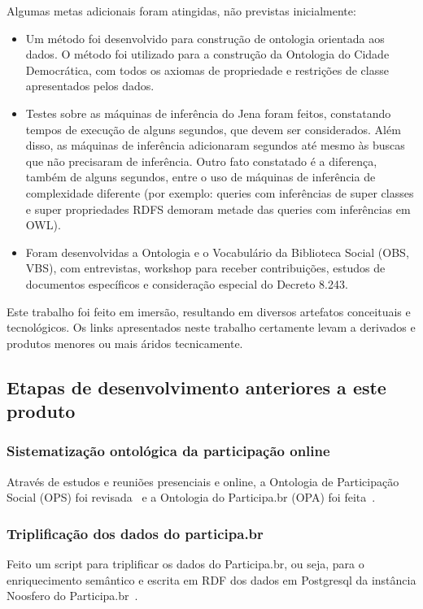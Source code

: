 \documentclass[12pt]{article}
\begin{document}
Algumas metas adicionais foram atingidas, não previstas inicialmente:
\begin{itemize}
    \item Um método foi desenvolvido para construção de ontologia orientada aos dados. O método foi utilizado para a construção da Ontologia do Cidade Democrática, com todos os axiomas de propriedade e restrições de classe apresentados pelos dados.
    \item Testes sobre as máquinas de inferência do Jena foram feitos, constatando tempos de execução de alguns segundos, que devem ser considerados. Além disso, as máquinas de inferência adicionaram segundos até mesmo às buscas que não precisaram de inferência. Outro fato constatado é a diferença, também de alguns segundos, entre o uso de máquinas de inferência de complexidade diferente (por exemplo: queries com inferências de super classes e super propriedades RDFS demoram metade das queries com inferências em OWL).
    \item Foram desenvolvidas a Ontologia e o Vocabulário da Biblioteca Social (OBS, VBS), com entrevistas, workshop para receber contribuições, estudos de documentos específicos e consideração especial do Decreto 8.243.
\end{itemize}

Este trabalho foi feito em imersão, resultando em diversos artefatos conceituais e tecnológicos. Os links apresentados neste trabalho certamente levam a derivados e produtos menores ou mais áridos tecnicamente.

\subsection{Etapas de desenvolvimento anteriores a este produto}
\subsubsection{Sistematização ontológica da participação online}
Através de estudos e reuniões presenciais e online, a Ontologia de Participação Social (OPS) foi revisada~\cite{OPS} e a Ontologia do Participa.br (OPA) foi feita~\cite{OPA}.
\subsubsection{Triplificação dos dados do participa.br}
Feito um script para triplificar os dados do Participa.br, ou seja, para o enriquecimento semântico e escrita em RDF dos dados em Postgresql da instância Noosfero do Participa.br~\cite{triplifica}.
\end{document}
